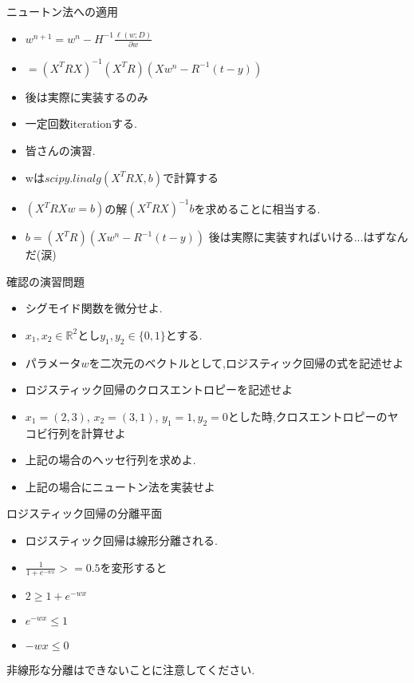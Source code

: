 \begin{frame}{ニュートン法への適用}
\begin{itemize}
\item $w^{n+1} = w^n - H^{-1}\frac{\ell(w;D)}{\partial w}$
  \item $= (X^TRX)^{-1}(X^TR)(Xw^{n} - R^{-1}(t - y))$
\item 後は実際に実装するのみ
  \item 一定回数iterationする.
  \item 皆さんの演習.
  \item wは$scipy.linalg(X^TRX, b)$で計算する
  \item $(X^TRX w = b)$の解$(X^TRX)^{-1} b$を求めることに相当する.
  \item $b = (X^TR)(Xw^{n} - R^{-1}(t - y))$
後は実際に実装すればいける...はずなんだ(涙)
\end{itemize}
\end{frame}

\begin{frame}{確認の演習問題}
\begin{itemize}
\item シグモイド関数を微分せよ.
\item $x_1, x_2 \in \mathbb{R}^2$とし$y_1, y_2 \in  \{0, 1\}$とする.
  \item パラメータ$w$を二次元のベクトルとして,ロジスティック回帰の式を記述せよ
  \item ロジスティック回帰のクロスエントロピーを記述せよ
  \item $x_1 = (2, 3)$, $x_2 = (3, 1)$, $y_1 = 1, y_2 = 0$とした時,クロスエントロピーのヤコビ行列を計算せよ
  \item 上記の場合のヘッセ行列を求めよ.
  \item 上記の場合にニュートン法を実装せよ
\end{itemize}
\end{frame}

\begin{frame}{ロジスティック回帰の分離平面}
\begin{itemize}
\item ロジスティック回帰は線形分離される.
  \item $\frac{1}{1 + e^{-wx}} >= 0.5$を変形すると
  \item $2 \ge 1 + e^{-wx}$
  \item $e^{-wx} \le 1$
  \item $-wx \le 0$
\end{itemize}
非線形な分離はできないことに注意してください.
\end{frame}

